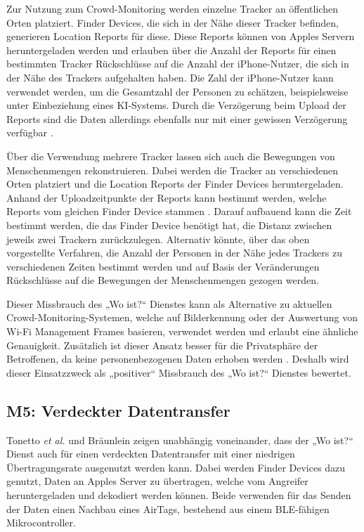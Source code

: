 Zur Nutzung zum Crowd-Monitoring werden einzelne Tracker an öffentlichen Orten platziert.
Finder Devices, die sich in der Nähe dieser Tracker befinden, generieren Location Reports für diese.
Diese Reports können von Apples Servern heruntergeladen werden und erlauben über die Anzahl der Reports für einen bestimmten Tracker Rückschlüsse auf die Anzahl der iPhone-Nutzer, die sich in der Nähe des Trackers aufgehalten haben.
Die Zahl der iPhone-Nutzer kann verwendet werden, um die Gesamtzahl der Personen zu schätzen, beispielsweise unter Einbeziehung eines KI-Systems.
Durch die Verzögerung beim Upload der Reports sind die Daten allerdings ebenfalls nur mit einer gewissen Verzögerung verfügbar \cite{Tonetto_FindMy}.

Über die Verwendung mehrere Tracker lassen sich auch die Bewegungen von Menschenmengen rekonstruieren.
Dabei werden die Tracker an verschiedenen Orten platziert und die Location Reports der Finder Devices heruntergeladen.
Anhand der Uploadzeitpunkte der Reports kann bestimmt werden, welche Reports vom gleichen Finder Device stammen \cite{Tonetto_FindMy}.
Darauf aufbauend kann die Zeit bestimmt werden, die das Finder Device benötigt hat, die Distanz zwischen jeweils zwei Trackern zurückzulegen.
Alternativ könnte, über das oben vorgestellte Verfahren, die Anzahl der Personen in der Nähe jedes Trackers zu verschiedenen Zeiten bestimmt werden und auf Basis der Veränderungen Rückschlüsse auf die Bewegungen der Menschenmengen gezogen werden.


Dieser Missbrauch des „Wo ist?“ Dienstes kann als Alternative zu aktuellen Crowd-Monitoring-Systemen, welche auf Bilderkennung oder der Auswertung von Wi-Fi Management Frames basieren, verwendet werden und erlaubt eine ähnliche Genauigkeit.
Zusätzlich ist dieser Ansatz besser für die Privatsphäre der Betroffenen, da keine personenbezogenen Daten erhoben werden \cite{Tonetto_FindMy}.
Deshalb wird dieser Einsatzzweck als „positiver“ Missbrauch des „Wo ist?“ Dienstes bewertet.


\subsection[M5]{M5: Verdeckter Datentransfer}
\label{missbrauch:5}
Tonetto \textit{et al.} \cite{Tonetto_FindMy} und Bräunlein \cite{braeunlein_sendmy} zeigen unabhängig voneinander, dass der „Wo ist?“ Dienst auch für einen verdeckten Datentransfer mit einer niedrigen Übertragungsrate ausgenutzt werden kann.
Dabei werden Finder Devices dazu genutzt, Daten an Apples Server zu übertragen, welche vom Angreifer heruntergeladen und dekodiert werden können.
Beide verwenden für das Senden der Daten einen Nachbau eines AirTags, bestehend aus einem \ac{BLE}-fähigen Mikrocontroller.

